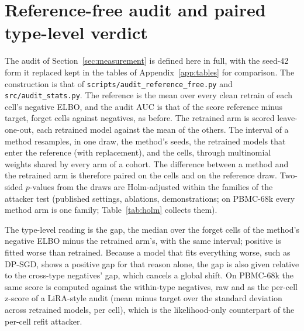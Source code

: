 \documentclass{article}
\begin{document}
\begin{table}[h]
\centering
\caption{Out-of-fold AUC of a standardized logistic regression restricted to one feature group (10 fold splits). Generated from \texttt{feature\_group\_check.json}.}
\label{tab:feature_groups}
\small
\resizebox{\textwidth}{!}{}
\end{table}

\begin{table}[h]
\centering
\caption{Training-free attacks on PBMC-33k cluster 13, AUC (advantage). The retrained model is the clean retrain of seed 42, and the two unlearned models are single seeds of extra-gradient and Fisher scrubbing. Generated from \texttt{attack\_suite\_results.json}.}
\label{tab:attacks}

\end{table}

\section{Reference-free audit and paired type-level verdict}
\label{app:reffree}

The audit of Section~\ref{sec:measurement} is defined here in full, with the seed-42 form it replaced kept in the tables of Appendix~\ref{app:tables} for comparison. The construction is that of \texttt{scripts/audit\_reference\_free.py} and \texttt{src/audit\_stats.py}. The reference is the mean over every clean retrain of each cell's negative ELBO, and the audit AUC is that of the score reference minus target, forget cells against negatives, as before. The retrained arm is scored leave-one-out, each retrained model against the mean of the others. The interval of a method resamples, in one draw, the method's seeds, the retrained models that enter the reference (with replacement), and the cells, through multinomial weights shared by every arm of a cohort. The difference between a method and the retrained arm is therefore paired on the cells and on the reference draw. Two-sided $p$-values from the draws are Holm-adjusted within the families of the attacker test (published settings, ablations, demonstrations; on PBMC-68k every method arm is one family; Table~\ref{tab:holm} collects them).

The type-level reading is the gap, the median over the forget cells of the method's negative ELBO minus the retrained arm's, with the same interval; positive is fitted worse than retrained. Because a model that fits everything worse, such as DP-SGD, shows a positive gap for that reason alone, the gap is also given relative to the cross-type negatives' gap, which cancels a global shift. On PBMC-68k the same score is computed against the within-type negatives, raw and as the per-cell z-score of a LiRA-style audit (mean minus target over the standard deviation across retrained models, per cell), which is the likelihood-only counterpart of the per-cell refit attacker.
\end{document}

